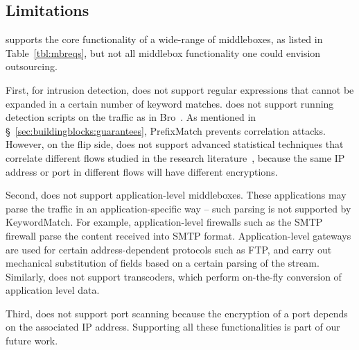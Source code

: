 \subsection{Limitations}\label{s:limitations}

 \sys supports the core functionality of a wide-range of  middleboxes, as listed in Table~\ref{tbl:mbreqs},
but not all middlebox functionality one could envision outsourcing.

First, for intrusion detection, \sys does not support regular expressions that cannot be expanded 
in a certain number of keyword matches. \sys does not support running detection scripts on the traffic 
as in Bro~\cite{bro}. As mentioned in \S~\ref{sec:buildingblocks:guarantees}, PrefixMatch prevents correlation attacks.
However, on the flip side, \sys does not support advanced statistical techniques that correlate different flows
studied in the research literature~\cite{steppingstones}, because the same IP address or port in different flows
will have different encryptions.

Second, \sys does not support application-level middleboxes.
These applications may parse the traffic in an application-specific way -- such parsing is not supported by KeywordMatch.
For example, application-level firewalls such as the SMTP firewall parse the content received into SMTP format. Application-level gateways are used for  certain address-dependent 
protocols such as FTP, and carry 
out mechanical substitution of fields based on a certain parsing of the stream.
Similarly, \sys does not support transcoders, which perform on-the-fly conversion of application level 
data.

Third, \sys does not support port scanning because the encryption of a port depends on the associated IP address. 
Supporting all these functionalities is part of our future work.

